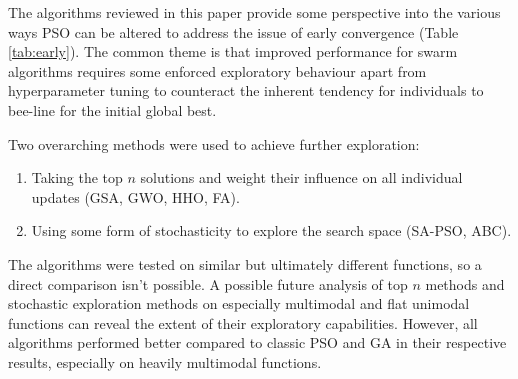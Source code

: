 \documentclass[a4paper, 12pt]{extarticle}
\begin{document}
The algorithms reviewed in this paper provide some perspective into the various ways PSO can be altered to address the issue of early convergence (Table \ref{tab:early}). The common theme is that improved performance for swarm algorithms requires some enforced exploratory behaviour apart from hyperparameter tuning to counteract the inherent tendency for individuals to bee-line for the initial global best.

Two overarching methods were used to achieve further exploration:
\begin{enumerate}
    \item Taking the top $n$ solutions and weight their influence on all individual updates (GSA, GWO, HHO, FA).
    \item Using some form of stochasticity to explore the search space (SA-PSO, ABC).
\end{enumerate}

The algorithms were tested on similar but ultimately different functions, so a direct comparison isn't possible. A possible future analysis of top $n$ methods and stochastic exploration methods on especially multimodal and flat unimodal functions can reveal the extent of their exploratory capabilities. However, all algorithms performed better compared to classic PSO and GA in their respective results, especially on heavily multimodal functions. 



\newpage

\printbibliography
\end{document}
